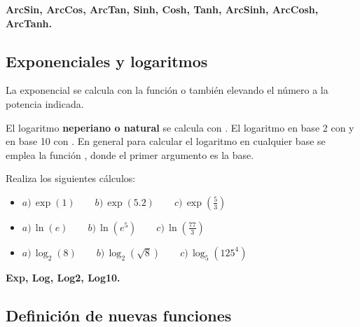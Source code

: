 \documentclass[a4paper,10pt, draft]{article}
\newcommand{\com}[1]{\textbf{\color{blue}{#1}}}
\newenvironment{ejer}{\begin{tcolorbox}[center title, title=Ejercicios,
fonttitle=\sffamily\bfseries,colback=blue!5,colframe=orange]}{\end{tcolorbox}}
\newenvironment{funciones}{\begin{tcolorbox}[center title, title=Nuevas funciones, fonttitle=\sffamily\bfseries, colback=green!5!white,colframe=red!75!black]}{\end{tcolorbox}\bigskip}
\begin{document}
\begin{funciones}

\textbf{ArcSin, ArcCos, ArcTan, Sinh, Cosh, Tanh, ArcSinh, ArcCosh, ArcTanh.}


\end{funciones}

 \newpage


\subsection{Exponenciales y logaritmos}

La exponencial se calcula con la función \com{Exp[x]} o también elevando el número \com{E} a la potencia indicada.

El logaritmo \textbf{neperiano o natural} se calcula con \com{Log[x]}. El logaritmo en base 2 con \com{Log2[x]} y en base 10 con \com{Log10[x]}. En general para calcular el logaritmo en cualquier base se emplea la función \com{Log[b,x]}, donde el primer argumento es la base.


\begin{ejer}

Realiza los siguientes cálculos:

\begin{itemize}

\item  $a)\,\displaystyle \exp(1) \qquad b)\, \exp(5.2) \qquad c)\, \exp\left(\frac{5}{3}\right)$


\item  $\displaystyle  a)\, \ln(e) \qquad b)\,\ln\left(e^5\right) \qquad c)\,\ln\left(\frac{77}{3}\right)$


\item $\displaystyle a)\, \log_2(8)\qquad b)\,\log_{2}(\sqrt{8})\qquad c)\, \log_{5}(125^4)$

\end{itemize}

\end{ejer} 



\begin{funciones}

\textbf{Exp, Log, Log2, Log10.}


\end{funciones}

 \newpage

\subsection{Definición de nuevas funciones}
\end{document}
